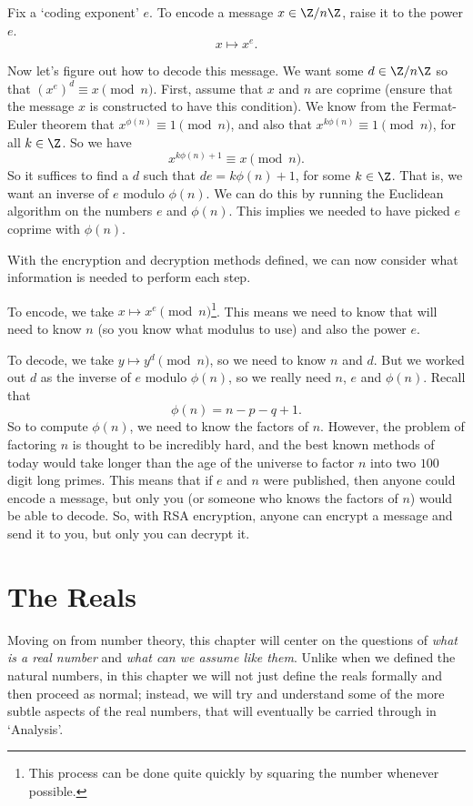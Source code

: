 \documentclass[a4paper]{scrreprt}
\begin{document}
Fix a `coding exponent' $e$.
To encode a message $x \in \Z/n\Z$, raise it to the power $e$.
$$
x \longmapsto x^e.
$$

Now let's figure out how to decode this message. We want some $d \in \Z/n\Z$ so that $(x^e)^d \equiv x \pmod{n}$. First, assume that $x$ and $n$ are coprime (ensure that the message $x$ is constructed to have this condition).
We know from the Fermat-Euler theorem that $x^{\phi(n)} \equiv 1 \pmod{n}$, and also that $x^{k \phi(n)} \equiv 1 \pmod{n}$, for all $k \in \Z$. So we have
$$
x^{k \phi(n) + 1} \equiv x \pmod{n}.
$$
So it suffices to find a $d$ such that $de = k \phi(n) + 1$, for some $k \in \Z$. That is, we want an inverse of $e$ modulo $\phi(n)$. We can do this by running the Euclidean algorithm on the numbers $e$ and $\phi(n)$. This implies we needed to have picked $e$ coprime with $\phi(n)$.

With the encryption and decryption methods defined, we can now consider what information is needed to perform each step.

To encode, we take $x \longmapsto x^e \pmod{n}$\footnote{This process can be done quite quickly by squaring the number whenever possible.}. This means we need to know that will need to know $n$ (so you know what modulus to use) and also the power $e$.

To decode, we take $y \longmapsto y^d \pmod{n}$, so we need to know $n$ and $d$. But we worked out $d$ as the inverse of $e$ modulo $\phi(n)$, so we really need $n$, $e$ and $\phi(n)$. Recall that
$$
\phi(n) = n - p - q + 1.
$$
So to compute $\phi(n)$, we need to know the factors of $n$.
However, the problem of factoring $n$ is thought to be incredibly hard, and the best known methods of today would take longer than the age of the universe to factor $n$ into two $100$ digit long primes. 
This means that if $e$ and $n$ were published, then anyone could encode a message, but only you (or someone who knows the factors of $n$) would be able to decode. So, with RSA encryption, anyone can encrypt a message and send it to you, but only you can decrypt it.


\chapter{The Reals}

Moving on from number theory, this chapter will center on the questions of \emph{what is a real number} and \emph{what can we assume like them}.
Unlike when we defined the natural numbers, in this chapter we will not just define the reals formally and then proceed as normal; instead, we will try and understand some of the more subtle aspects of the real numbers, that will eventually be carried through in `Analysis'.
\end{document}
